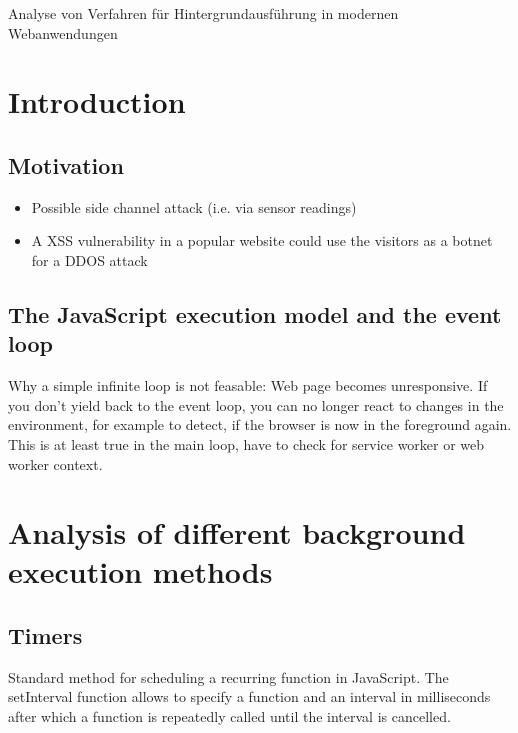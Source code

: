 \documentclass[article,type=bsc,colorback,accentcolor=tud9c]{tudthesis}
\begin{document}
    {Analyse von Verfahren für Hintergrundausführung in modernen Webanwendungen}
  \author{Yannick Reifschneider}
  \dateofexam{\today}{\today}
  \makethesistitle

  \tableofcontents

  \newpage
  \section{Introduction}

  
  
  \subsection{Motivation}

  \begin{itemize}
  \item Possible side channel attack (i.e. via sensor readings)
  \item A XSS vulnerability in a popular website could use the visitors as a botnet for a DDOS attack
  \end{itemize}
  
  \subsection{The JavaScript execution model and the event loop}

  Why a simple infinite loop is not feasable: Web page becomes unresponsive. If you don't yield back to the event loop, you can no longer react to changes in the environment, for example to detect, if the browser is now in the foreground again. This is at least true in the main loop, have to check for service worker or web worker context.
  

  \newpage
  \section{Analysis of different background execution methods}
  
  \subsection{Timers}

  Standard method for scheduling a recurring function in JavaScript. The setInterval function allows to specify a function and an interval in milliseconds after which a function is repeatedly called until the interval is cancelled.
  
\end{document}
